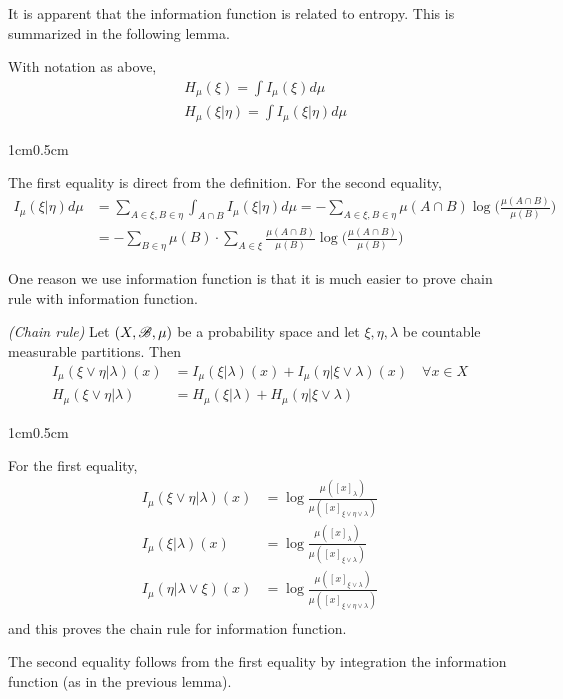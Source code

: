 \documentclass[12pt,a4paper]{report}
\newenvironment{proof}
{\begin{changemargin}{1cm}{0.5cm} 
	}%
	{\end{changemargin}
}
\begin{document}
It is apparent that the information function is related to entropy. This is summarized in the following lemma.
\s

\lem With notation as above,
\begin{align*}
& H_{\mu}(\xi) = \int I_{\mu} (\xi) d \mu \\
& H_{\mu}(\xi | \eta) = \int I_{\mu} (\xi | \eta) d \mu
\end{align*}
\begin{proof}
\pf The first equality is direct from the definition. For the second equality,
\begin{align*}
I_{\mu} (\xi |\eta) d\mu &= \sum_{A\in \xi, B \in \eta} \int_{A \cap B} I_{\mu}(\xi | \eta) d\mu = - \sum_{A \in \xi, B\in \eta} \mu(A\cap B) \log \Big( \frac{\mu(A \cap B)}{\mu(B)}\Big) \\
&= -\sum_{B\in \eta} \mu(B) \cdot \sum_{A\in \xi} \frac{\mu(A\cap B)}{\mu(B)} \log \Big( \frac{\mu(A\cap B)}{\mu(B)} \Big)
\end{align*}

\eop
\end{proof}
\s

One reason we use information function is that it is much easier to prove chain rule with information function.
\s

\lem \emph{(Chain rule)} Let $(X,\mathscr{B}, \mu)$ be a probability space and let $\xi, \eta, \lambda$ be countable measurable partitions. Then
\begin{align*}
I_{\mu} (\xi \vee \eta | \lambda)(x) &= I_{\mu}(\xi | \lambda) (x) + I_{\mu}(\eta | \xi \vee \lambda)(x) \quad \forall x \in X \\
H_{\mu} (\xi \vee \eta | \lambda) &= H_{\mu}(\xi | \lambda)  + H_{\mu}(\eta | \xi \vee \lambda)
\end{align*}
\begin{proof}
\pf For the first equality,
\begin{align*}
I_{\mu} (\xi \vee \eta |\lambda) (x)  &= \log \frac{\mu ([x]_{\lambda})}{\mu([x]_{\xi \vee \eta \vee \lambda})} \\
I_{\mu} (\xi |\lambda) (x)  &= \log \frac{\mu ([x]_{\lambda})}{\mu([x]_{\xi \vee \lambda})} \\
I_{\mu} (\eta |\lambda \vee \xi) (x)  &= \log \frac{\mu ([x]_{\xi \vee \lambda})}{\mu([x]_{\xi \vee \eta \vee \lambda})} \\
\end{align*}
and this proves the chain rule for information function.

\quad The second equality follows from the first equality by integration the information function (as in the previous lemma).

\eop
\end{proof}
\s
\end{document}
